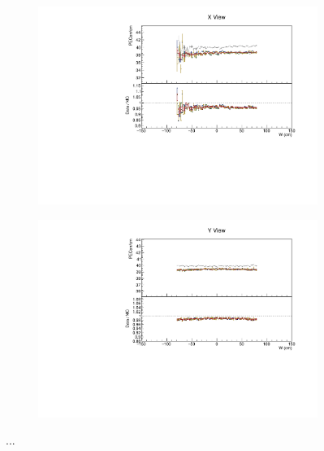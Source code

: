 \documentclass[12pt,a4paper]{article}
\begin{document}
\begin{figure}[h!]
\begin{subfigure}{0.5\textwidth}
  \end{subfigure}
  \begin{subfigure}{0.5\textwidth}
    \includegraphics[width=\linewidth]{essentialsec_tb/pecorrcm_w_x.pdf}
  \end{subfigure}
  \begin{subfigure}{0.5\textwidth}
    \includegraphics[width=\linewidth]{essentialsec_tb/pecorrcm_w_y.pdf}
  \end{subfigure}
  \caption{...}
  \label{figAbsCalibW1}
\end{figure}
\end{document}
